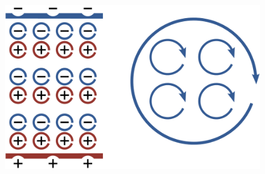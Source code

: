 \documentclass[xcolor=table,serif]{beamer}
\begin{document}
{\begin{columns}
		\begin{figure}
		\centering
		\includegraphics[scale=0.3]{magnetization.png}
		\end{figure}
	\end{columns}
	}
	
\end{document}
